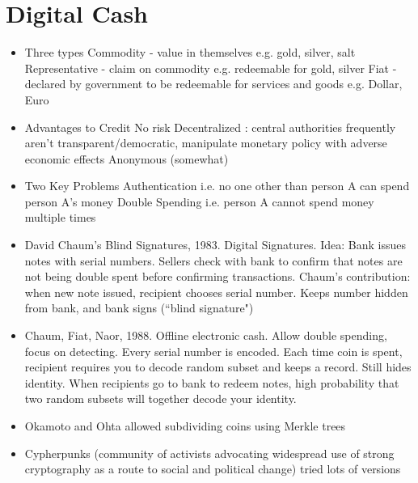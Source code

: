 \documentclass{article}
\begin{document}
\section*{Digital Cash}
\begin{itemize}
\item Three types
\subitem Commodity - value in themselves e.g. gold, silver, salt
\subitem Representative - claim on commodity e.g. redeemable for gold, silver
\subitem Fiat - declared by government to be redeemable for services and goods e.g. Dollar, Euro

\item Advantages to Credit
\subitem No risk
\subitem Decentralized : central authorities frequently aren't transparent/democratic, manipulate monetary policy with adverse economic effects
\subitem Anonymous (somewhat)

\item Two Key Problems
\subitem Authentication i.e. no one other than person A can spend person A's money
\subitem Double Spending i.e. person A cannot spend money multiple times

\item David Chaum's Blind Signatures, 1983. Digital Signatures. Idea: Bank issues notes with serial numbers. Sellers check with bank to confirm that notes are not being double spent before confirming transactions.
\subitem Chaum's contribution: when new note issued, recipient chooses serial number. Keeps number hidden from bank, and bank signs (``blind signature")

\item Chaum, Fiat, Naor, 1988. Offline electronic cash. Allow double spending, focus on detecting. Every serial number is encoded. Each time coin is spent, recipient requires you to decode random subset and keeps a record. Still hides identity. When recipients go to bank to redeem notes, high probability that two random subsets will together decode your identity.

\item Okamoto and Ohta allowed subdividing coins using Merkle trees

\item Cypherpunks (community of activists advocating widespread use of strong cryptography as a route to social and political change) tried lots of versions
\end{itemize}
\end{document}
